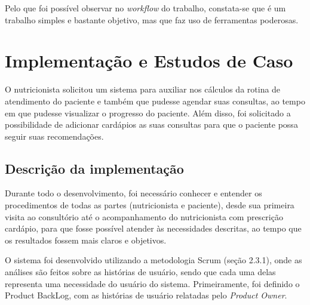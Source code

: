 \documentclass[
	12pt,				%
    oneside,			%
	a4paper,			%
	english,			%
	french,				%
	spanish,			%
	brazil,				%
	]{abntex2}
\begin{document}
Pelo que foi possível observar no \textit{workflow} do trabalho, constata-se que é um trabalho simples e bastante objetivo, mas que faz uso de ferramentas poderosas.



\chapter{Implementação e Estudos de Caso}

O nutricionista solicitou um sistema para auxiliar nos cálculos da rotina
de atendimento do paciente e também que pudesse agendar suas consultas, ao
tempo em que pudesse visualizar o progresso do paciente. Além disso, foi solicitado a possibilidade de adicionar cardápios as suas consultas para que o paciente possa seguir
suas recomendações. 

\section{Descrição da implementação}

Durante todo o desenvolvimento, foi necessário conhecer e entender os
procedimentos de todas as partes (nutricionista e paciente), desde sua primeira visita
ao consultório até o acompanhamento do nutricionista com prescrição cardápio, para
que fosse possível atender às necessidades descritas, ao tempo que os resultados
fossem mais claros e objetivos.

O sistema foi desenvolvido utilizando a metodologia Scrum (seção 2.3.1),
onde as análises são feitos sobre as histórias de usuário, sendo que cada uma delas
representa uma necessidade do usuário do sistema. Primeiramente, foi definido o
Product BackLog, com as histórias de usuário relatadas pelo \textit{Product Owner}.
\end{document}
